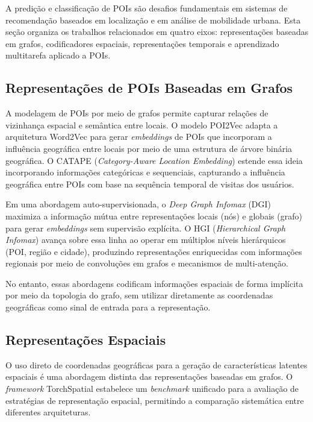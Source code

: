 A predição e classificação de POIs são desafios fundamentais em sistemas de recomendação baseados em localização e em análise de mobilidade urbana. Esta seção organiza os trabalhos relacionados em quatro eixos: representações baseadas em grafos, codificadores espaciais, representações temporais e aprendizado multitarefa aplicado a POIs.

\subsection{Representações de POIs Baseadas em Grafos}

A modelagem de POIs por meio de grafos permite capturar relações de vizinhança espacial e semântica entre locais. O modelo POI2Vec \cite{feng2017poi2vec} adapta a arquitetura Word2Vec para gerar \textit{embeddings} de POIs que incorporam a influência geográfica entre locais por meio de uma estrutura de árvore binária geográfica. O CATAPE (\textit{Category-Aware Location Embedding}) \cite{rahmani2019category} estende essa ideia incorporando informações categóricas e sequenciais, capturando a influência geográfica entre POIs com base na sequência temporal de visitas dos usuários.

Em uma abordagem auto-supervisionada, o \textit{Deep Graph Infomax} (DGI) \cite{velickovic2019deep} maximiza a informação mútua entre representações locais (nós) e globais (grafo) para gerar \textit{embeddings} sem supervisão explícita. O HGI (\textit{Hierarchical Graph Infomax}) \cite{huang2023learning} avança sobre essa linha ao operar em múltiplos níveis hierárquicos (POI, região e cidade), produzindo representações enriquecidas com informações regionais por meio de convoluções em grafos e mecanismos de multi-atenção. 

No entanto, essas abordagens codificam informações espaciais de forma implícita por meio da topologia do grafo, sem utilizar diretamente as coordenadas geográficas como sinal de entrada para a representação.

\subsection{Representações Espaciais}

O uso direto de coordenadas geográficas para a geração de características latentes espaciais é uma abordagem distinta das representações baseadas em grafos. O \textit{framework} TorchSpatial \cite{wu2024torchspatial} estabelece um \textit{benchmark} unificado para a avaliação de estratégias de representação espacial, permitindo a comparação sistemática entre diferentes arquiteturas.

